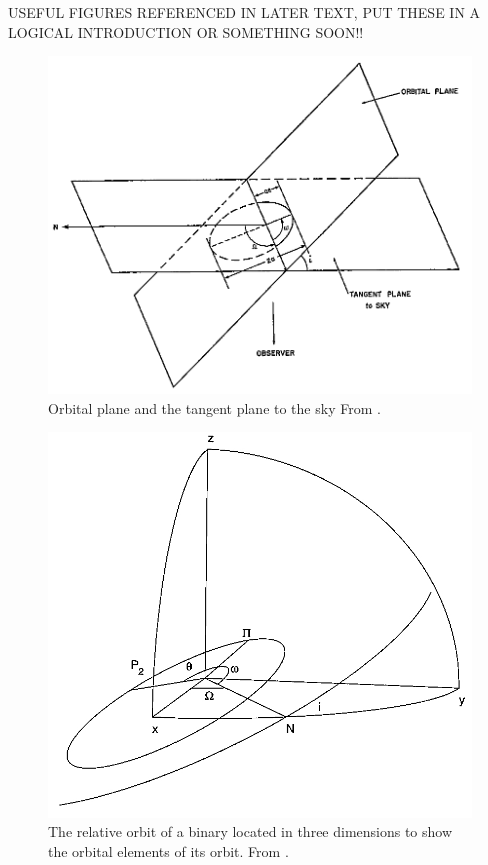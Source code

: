 \documentclass[12pt,preprint]{aastex}
\begin{document}
\clearpage

USEFUL FIGURES REFERENCED IN LATER TEXT, PUT THESE IN A LOGICAL INTRODUCTION OR SOMETHING SOON!!

\begin{figure}[htp]
\begin{center}
\includegraphics[scale=0.575]{Figures/BattenPG8Fig.jpeg}
\caption[Orbital Plane vs Plane of Sky]{ Orbital plane and the tangent plane to the sky  From \citet{batten}. }
\label{fig:OPvsSky}
\end{center}
\end{figure}

\begin{figure}[htp]
\begin{center}
\includegraphics[scale=0.5]{Figures/HilditchPG41Fig.jpeg}
\caption[Orbital Elements]{ The relative orbit of a  binary located in three dimensions to show the orbital elements of its orbit.  From \citet{hilditch}. }
\label{fig:orbElements}
\end{center}
\end{figure}
\end{document}
